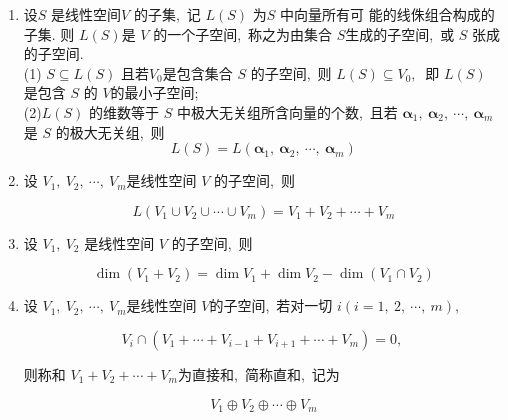 \begin{enumerate}
		\item 设$  S $ 是线性空间$  V $ 的子集,\  记 $ L(S) $ 为$  S$ 中向量所有可 能的线侏组合构成的子集. 则  $L(S)  $是 $ V$  的一个子空间,\  称之为由集合 $ S  $生成的子空间,\ 或  $S $ 张成的子空间.\\
		(1) $ S \subseteq L(S)$  且若$  V_{0}  $是包含集合 $ S$  的子空间,\  则  $L(S) \subseteq V_{0},\ $ 即 $ L(S) $ 是包含 $ S $ 的  $V  $的最小子空间;\\
		(2)$  L(S) $ 的维数等于 $ S $ 中极大无关组所含向量的个数,\  且若  $\boldsymbol{\alpha}_{1},\  \boldsymbol{\alpha}_{2},\  \cdots,\  \boldsymbol{\alpha}_{m}  $是 $ S$  的极大无关组,\  则
		$$L(S)=L\left(\boldsymbol{\alpha}_{1},\  \boldsymbol{\alpha}_{2},\  \cdots,\  \boldsymbol{\alpha}_{m}\right)$$
		\item 设  $V_{1},\  V_{2},\  \cdots,\  V_{m}  $是线性空间  $V$  的子空间,\ 则
		
		$$L\left(V_{1} \cup V_{2} \cup \cdots \cup V_{m}\right)=V_{1}+V_{2}+\cdots+V_{m}
		$$
		\item 设  $V_{1},\  V_{2} $ 是线性空间 $ V $ 的子空间,\ 则
		
		$$\operatorname{dim}\left(V_{1}+V_{2}\right)=\operatorname{dim} V_{1}+\operatorname{dim} V_{2}-\operatorname{dim}\left(V_{1} \cap V_{2}\right)$$
		
		\item 设  $V_{1},\  V_{2},\  \cdots,\  V_{m}  $是线性空间  $V  $的子空间,\ 若对一切  $i(i=1,\ 2,\  \cdots,\  m) ,\ $
		
		$$V_{i} \cap\left(V_{1}+\cdots+V_{i-1}+V_{i+1}+\cdots+V_{m}\right)=0,\ $$
		
		则称和 $ V_{1}+V_{2}+\cdots+V_{m}  $为直接和,\  简称直和,\  记为
		
		$$V_{1} \oplus V_{2} \oplus \cdots \oplus V_{m}$$
		

\end{enumerate}
